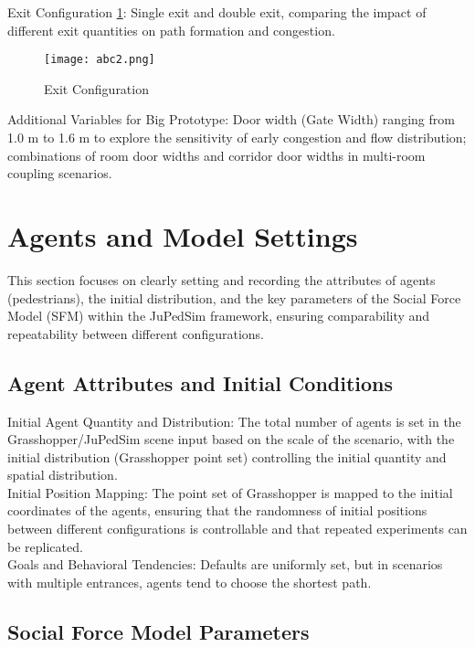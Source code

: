 Exit Configuration \ref{fig:ExitConfiguration}: Single exit and double exit, comparing the impact of different exit quantities on path formation and congestion.
\begin{figure}[h]
    \centering
    \texttt{[image: abc2.png]}
    \caption{Exit Configuration}
    \label{fig:ExitConfiguration}
\end{figure}

Additional Variables for Big Prototype: Door width (Gate Width) ranging from 1.0 m to 1.6 m to explore the sensitivity of early congestion and flow distribution; combinations of room door widths and corridor door widths in multi-room coupling scenarios.


\section{Agents and Model Settings}

This section focuses on clearly setting and recording the attributes of agents (pedestrians), the initial distribution, and the key parameters of the Social Force Model (SFM) within the JuPedSim framework, ensuring comparability and repeatability between different configurations.

\subsection{Agent Attributes and Initial Conditions}

Initial Agent Quantity and Distribution: The total number of agents is set in the Grasshopper/JuPedSim scene input based on the scale of the scenario, with the initial distribution (Grasshopper point set) controlling the initial quantity and spatial distribution.
\\Initial Position Mapping: The point set of Grasshopper is mapped to the initial coordinates of the agents, ensuring that the randomness of initial positions between different configurations is controllable and that repeated experiments can be replicated.
\\Goals and Behavioral Tendencies: Defaults are uniformly set, but in scenarios with multiple entrances, agents tend to choose the shortest path.

\subsection{Social Force Model Parameters}

